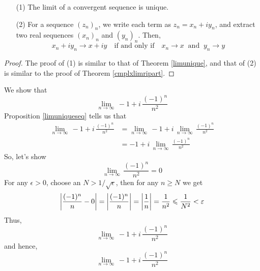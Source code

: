 \begin{proposition}\label{limuniqueseq}\hfill
\begin{itemize}
\item[(1)] The limit of a convergent sequence is unique.
\item[(2)] For a sequence $(z_n)_n$, we write each term as $z_n = x_n + iy_n$, and extract two real sequences $(x_n)_n$ and $(y_n)_n$. Then, 
\[x_n + iy_n \to x + iy \quad \text{if and only if} \quad x_n \to x\ \text{ and }\ y_n \to y\]
\end{itemize}
\end{proposition}
\begin{proof}
The proof of (1) is similar to that of Theorem \ref{limunique}, and that of (2) is similar to the proof of Theorem \ref{cmplxlimripart}.
\end{proof}

\vspace*{1em}

\begin{example}
We show that
\[\lim_{n \to \infty}\,-1 + i\,\frac{(-1)^n}{n^2}\]
Proposition \ref{limuniqueseq} tells us that
\begin{align*}
\lim_{n \to \infty}\,-1 + i\,\frac{(-1)^n}{n^2} &= \lim_{n \to \infty}\,-1 + i\,\lim_{n \to \infty}\,\frac{(-1)^n}{n^2}\\[0.5em]
&= -1 + i\,\lim_{n \to \infty}\,\frac{(-1)^n}{n^2}
\end{align*}
So, let's show
\[\lim_{n \to \infty}\,\frac{(-1)^n}{n^2} = 0\]
For any $\epsilon > 0$, choose an $N > 1/\sqrt{\epsilon}$, then for any $n \geq N$ we get
\[\left\lvert\frac{(-1)^n}{n} - 0\right\rvert = \left\lvert\frac{(-1)^n}{n}\right\rvert = \left\lvert\frac{1}{n}\right\rvert = \frac{1}{n^2} \leqslant \frac{1}{N^2} < \varepsilon\]
Thus, 
\[\lim_{n \to \infty}\,-1 + i\,\frac{(-1)^n}{n^2}\]
and hence,
\[\lim_{n \to \infty}\,-1 + i\,\frac{(-1)^n}{n^2}\]
\end{example}

